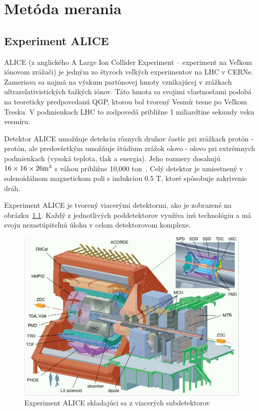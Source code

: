 \documentclass[thesismargins, thesislinespacing]{rnthesis}
\begin{document}
\chapter{Metóda merania}

\section{Experiment ALICE}

ALICE (z anglického A Large Ion Collider Experiment – experiment na Veľkom iónovom zrážači) je jedným zo štyroch veľkých experimentov na LHC v CERNe. Zameriava sa najmä na výskum partónovej hmoty vznikajúcej v zrážkach ultrarelativistických ťažkých iónov. Táto hmota sa svojimi vlastnosťami podobá na teoreticky predpovedanú QGP, ktorou bol tvorený Vesmír tesne po Veľkom Tresku. V podmienkach LHC to zodpovedá približne 1 miliardtine sekundy veku vesmíru.



Detektor  ALICE umožňuje detekciu rôznych druhov častíc pri zrážkach protón - protón, ale predovšetkým umožňuje štúdium zrážok olovo - olovo pri extrémnych podmienkach (vysoká teplota, tlak a energia). Jeho rozmery dosahujú $16\times 16\times26 \rm{m^3}$ s váhou približne 10,000 ton~\cite{alice}. Celý detektor je umiestnený v solenoidálnom magnetickom poli s indukciou 0.5 T, ktoré spôsobuje zakrivenie dráh.

Experiment ALICE je tvorený viacerými detektormi, ako je zobrazené na obrázku~\ref{ALICE}. Každý z jednotlivých poddetektorov využíva inú technológiu a má svoju nezastúpiteľnú úlohu v celom detektorovom komplexe.
\newpage

\begin{figure}[hbtp!]
	\begin{center}
		\includegraphics[width=\textwidth]{./Obrazky_praca/ALICE.png}
		\caption{Experiment ALICE skladajúci sa z viacerých subdetektorov~\cite{aliceDetektor}}
		\label{ALICE}
	\end{center}
\end{figure}
\end{document}
